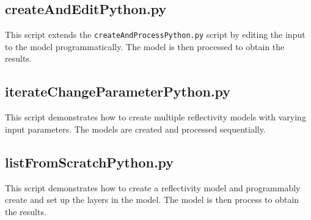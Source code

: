 \documentclass{article}
\begin{document}


\subsection{createAndEditPython.py} 

This script extends the
\texttt{createAndProcessPython.py} script by editing the input to the model
programmatically. The model is then processed to obtain the results.



\subsection{iterateChangeParameterPython.py} 
This script demonstrates how to create
multiple reflectivity models with varying input parameters. The models are created
and processed sequentially.



\subsection{listFromScratchPython.py} 
This script demonstrates how to create a
reflectivity model and programmably create and set up the layers in the model.
The model is then process to obtain the results.


\end{document}
